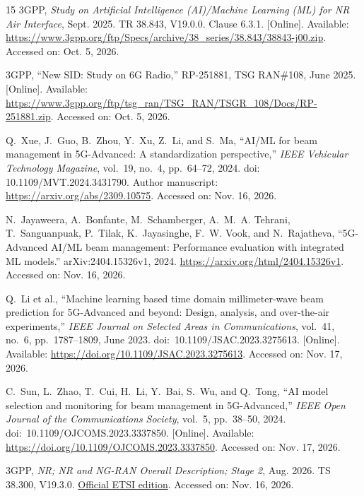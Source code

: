 \documentclass[journal,10pt]{IEEEtran}
\begin{document}
\begin{thebibliography}{15}
3GPP, {\em Study on Artificial Intelligence ({AI})/Machine Learning ({ML}) for
  {NR} Air Interface}, Sept. 2025.
\newblock TR 38.843, V19.0.0. Clause 6.3.1. [Online]. Available: \url{https://www.3gpp.org/ftp/Specs/archive/38_series/38.843/38843-j00.zip}. Accessed on: Oct. 5, 2026.

3GPP, ``New SID: Study on 6G Radio,'' RP-251881, TSG RAN\#108, June 2025. [Online]. Available: \url{https://www.3gpp.org/ftp/tsg_ran/TSG_RAN/TSGR_108/Docs/RP-251881.zip}. Accessed on: Oct. 5, 2026.

Q.~Xue, J.~Guo, B.~Zhou, Y.~Xu, Z.~Li, and S.~Ma, ``{AI/ML} for beam management
  in {5G-Advanced}: A standardization perspective,'' {\em IEEE Vehicular
  Technology Magazine}, vol.~19, no.~4, pp.~64--72, 2024.
\newblock doi:
  10.1109/MVT.2024.3431790. Author manuscript: \url{https://arxiv.org/abs/2309.10575}. Accessed on: Nov. 16, 2026.

N.~Jayaweera, A.~Bonfante, M.~Schamberger, A.~M.~A. Tehrani, T.~Sanguanpuak,
  P.~Tilak, K.~Jayasinghe, F.~W. Vook, and N.~Rajatheva, ``{5G-Advanced AI/ML}
  beam management: Performance evaluation with integrated {ML} models.''
  arXiv:2404.15326v1, 2024.
\newblock \url{https://arxiv.org/html/2404.15326v1}. Accessed on: Nov. 16, 2026.

Q.~Li et al., ``Machine learning based time domain millimeter-wave beam prediction for 5G-Advanced and beyond: Design, analysis, and over-the-air experiments,'' {\em IEEE Journal on Selected Areas in Communications}, vol.~41, no.~6, pp.~1787--1809, June 2023. doi:~10.1109/JSAC.2023.3275613. [Online]. Available: \url{https://doi.org/10.1109/JSAC.2023.3275613}. Accessed on: Nov. 17, 2026.

C.~Sun, L.~Zhao, T.~Cui, H.~Li, Y.~Bai, S.~Wu, and Q.~Tong, ``AI model selection and monitoring for beam management in 5G-Advanced,'' {\em IEEE Open Journal of the Communications Society}, vol.~5, pp.~38--50, 2024. doi:~10.1109/OJCOMS.2023.3337850. [Online]. Available: \url{https://doi.org/10.1109/OJCOMS.2023.3337850}. Accessed on: Nov. 17, 2026.

3GPP, {\em {NR; NR and NG-RAN} Overall Description; Stage 2}, Aug. 2026.
\newblock TS 38.300, V19.3.0.
  \href{https://www.etsi.org/deliver/etsi_ts/138300_138399/138300/19.03.00_60/ts_138300v190300p.pdf}{Official
  ETSI edition}. Accessed on: Nov. 16, 2026.


\end{thebibliography}
\end{document}
